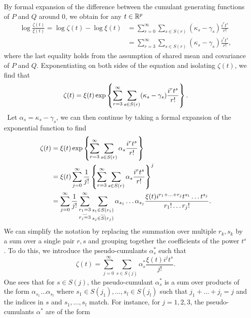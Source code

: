 By formal expansion of the difference between the cumulant generating functions of $P$ and $Q$ around 0, we obtain for any $t \in {\mathbb{R}^p}$
\begin{align*}
    \log \frac{\zeta(t)}{\xi(t)}
    = \log \zeta(t) - \log \xi(t) 
    &= \sum_{r=0}^\infty \sum_{s \in S(r)} (\kappa_s - \gamma_s)\frac{i^r t^s}{r!}\\
    &= \sum_{r=3}^\infty \sum_{s \in S(r)} (\kappa_s - \gamma_s)\frac{i^r t^s}{r!},
\end{align*}
where the last equality holds from the assumption of shared mean and covariance of $P$ and $Q$. Exponentiating on both sides of the equation and isolating $\zeta(t)$, we find that
\begin{equation*}
    \zeta(t) = \xi(t)\exp\left\{\sum_{r=3}^\infty \sum_{s \in S(r)} (\kappa_s - \gamma_s)\frac{i^r t^s}{r!}\right\}.
\end{equation*}
\
Let $\alpha_s = \kappa_s - \gamma_s$, we can then continue by taking a formal expansion of the exponential function to find
\begin{align*}
    \zeta(t)
    &= \xi(t)\exp\left\{\sum_{r=3}^\infty \sum_{s \in S(r)} \alpha_s\frac{i^r t^s}{r!}\right\}\\
    &= \xi(t)\sum_{j=0}^\infty \frac{1}{j!} \left\{\sum_{r=3}^\infty \sum_{s \in S(r)} \alpha_s\frac{i^r t^s}{r!}\right\}^j \\
    &=
    \sum_{j=0}^\infty \frac{1}{j!} 
    \sum_{\substack{r_1 = 3\\ \ldots \\r_j = 3}}^\infty
    \sum_{\substack{s_1 \in S(r_1)\\ \ldots \\s_j \in S(r_j)}}
    \alpha_{s_1}\ldots\alpha_{s_j}
    \frac{
        \xi(t) i^{r_1 + \ldots + r_j}
        t^{s_1} \ldots t^{s_j}
    }{
        r_1! \ldots r_j!
    }.
\end{align*}
We can simplify the notation by replacing the summation over multiple $r_k, s_k$ by a sum over a single pair $r, s$ and grouping together the coefficients of the power $t^s$. To do this, we introduce the pseudo-cumulants $\alpha^*_s$ such that
\begin{equation} \label{eq-char-expansion}
    \zeta(t) = 
    \sum_{j=0}^\infty 
    \sum_{s \in S(j)}
    \alpha^*_s \frac{\xi(t) i^{j} t^{s}}{j!}.
\end{equation}
One sees that for $s \in S(j)$, the pseudo-cumulant $\alpha^*_s$ is a sum over products of the form $\alpha_{s_1}\ldots\alpha_{s_l}$ where $s_1 \in S(j_1), \ldots, s_l \in S(j_l)$ such that $j_1 + \ldots + j_l = j$ and the indices in $s$ and $s_1, \ldots, s_l$ match. For instance, for $j = 1, 2, 3$, the pseudo-cumulants $\alpha^*$ are of the form
